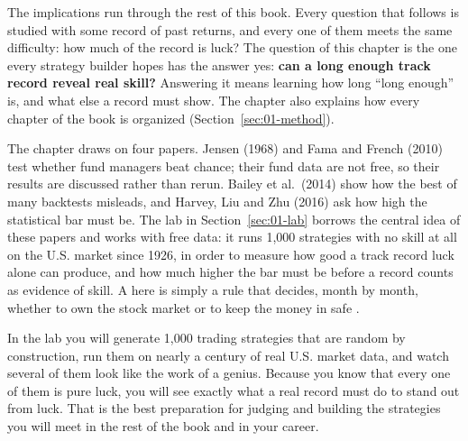 The implications run through the rest of this book. Every question that follows is studied with some record of past returns, and every one of them meets the same difficulty: how much of the record is luck? The question of this chapter is the one every strategy builder hopes has the answer yes: \textbf{can a long enough track record reveal real skill?} Answering it means learning how long ``long enough'' is, and what else a record must show. The chapter also explains how every chapter of the book is organized (Section~\ref{sec:01-method}).

The chapter draws on four papers. Jensen (1968) and Fama and French (2010) test whether fund managers beat chance; their fund data are not free, so their results are discussed rather than rerun. Bailey et al.\ (2014) show how the best of many backtests misleads, and Harvey, Liu and Zhu (2016) ask how high the statistical bar must be. The lab in Section~\ref{sec:01-lab} borrows the central idea of these papers and works with free data: it runs 1,000 strategies with no skill at all on the U.S. market since 1926, in order to measure how good a track record luck alone can produce, and how much higher the bar must be before a record counts as evidence of skill. A  here is simply a rule that decides, month by month, whether to own the stock market or to keep the money in safe .


In the lab you will generate 1,000 trading strategies that are random by construction, run them on nearly a century of real U.S. market data, and watch several of them look like the work of a genius. Because you know that every one of them is pure luck, you will see exactly what a real record must do to stand out from luck. That is the best preparation for judging and building the strategies you will meet in the rest of the book and in your career.

